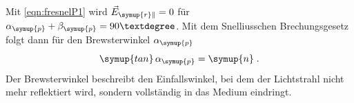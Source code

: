 Mit \autoref{eqn:fresnelP1} wird $\vec{E}_{\symup{r}\|} = 0$ für $\alpha_{\symup{p}}+\beta_{\symup{p}} = 90°$. Mit dem Snelliusschen Brechungsgesetz
folgt dann für den Brewsterwinkel $\alpha_{\symup{p}}$
\begin{equation*}
    \symup{tan}\,\alpha_{\symup{p}} = \symup{n} \; . 
\end{equation*}
Der Brewsterwinkel beschreibt den Einfallswinkel, bei dem der Lichtstrahl nicht mehr reflektiert wird, sondern vollständig in das Medium eindringt.
